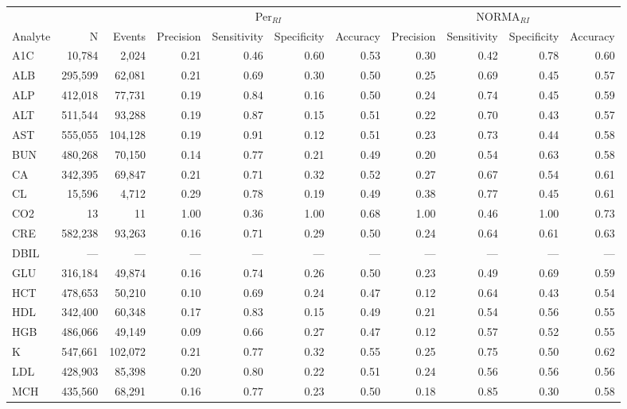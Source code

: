 \begin{table}[ht]
\centering
\footnotesize
\begin{tabular}{lrrrrrrrrrr}
\toprule
 & &  & \multicolumn{4}{c}{Per$_{RI}$} & \multicolumn{4}{c}{NORMA$_{RI}$} \\
\cmidrule(lr){4-7} \cmidrule(lr){8-11}
Analyte & N & Events & Precision & Sensitivity & Specificity & Accuracy & Precision & Sensitivity & Specificity & Accuracy \\
\midrule
A1C & 10,784 & 2,024 & 0.21 & 0.46 & 0.60 & 0.53 & 0.30 & 0.42 & 0.78 & 0.60 \\
ALB & 295,599 & 62,081 & 0.21 & 0.69 & 0.30 & 0.50 & 0.25 & 0.69 & 0.45 & 0.57 \\
ALP & 412,018 & 77,731 & 0.19 & 0.84 & 0.16 & 0.50 & 0.24 & 0.74 & 0.45 & 0.59 \\
ALT & 511,544 & 93,288 & 0.19 & 0.87 & 0.15 & 0.51 & 0.22 & 0.70 & 0.43 & 0.57 \\
AST & 555,055 & 104,128 & 0.19 & 0.91 & 0.12 & 0.51 & 0.23 & 0.73 & 0.44 & 0.58 \\
BUN & 480,268 & 70,150 & 0.14 & 0.77 & 0.21 & 0.49 & 0.20 & 0.54 & 0.63 & 0.58 \\
CA & 342,395 & 69,847 & 0.21 & 0.71 & 0.32 & 0.52 & 0.27 & 0.67 & 0.54 & 0.61 \\
CL & 15,596 & 4,712 & 0.29 & 0.78 & 0.19 & 0.49 & 0.38 & 0.77 & 0.45 & 0.61 \\
CO2 & 13 & 11 & 1.00 & 0.36 & 1.00 & 0.68 & 1.00 & 0.46 & 1.00 & 0.73 \\
CRE & 582,238 & 93,263 & 0.16 & 0.71 & 0.29 & 0.50 & 0.24 & 0.64 & 0.61 & 0.63 \\
DBIL & --- & --- & --- & --- & --- & --- & --- & --- & --- & --- \\
GLU & 316,184 & 49,874 & 0.16 & 0.74 & 0.26 & 0.50 & 0.23 & 0.49 & 0.69 & 0.59 \\
HCT & 478,653 & 50,210 & 0.10 & 0.69 & 0.24 & 0.47 & 0.12 & 0.64 & 0.43 & 0.54 \\
HDL & 342,400 & 60,348 & 0.17 & 0.83 & 0.15 & 0.49 & 0.21 & 0.54 & 0.56 & 0.55 \\
HGB & 486,066 & 49,149 & 0.09 & 0.66 & 0.27 & 0.47 & 0.12 & 0.57 & 0.52 & 0.55 \\
K & 547,661 & 102,072 & 0.21 & 0.77 & 0.32 & 0.55 & 0.25 & 0.75 & 0.50 & 0.62 \\
LDL & 428,903 & 85,398 & 0.20 & 0.80 & 0.22 & 0.51 & 0.24 & 0.56 & 0.56 & 0.56 \\
MCH & 435,560 & 68,291 & 0.16 & 0.77 & 0.23 & 0.50 & 0.18 & 0.85 & 0.30 & 0.58 \\

\end{tabular}
\end{table}
